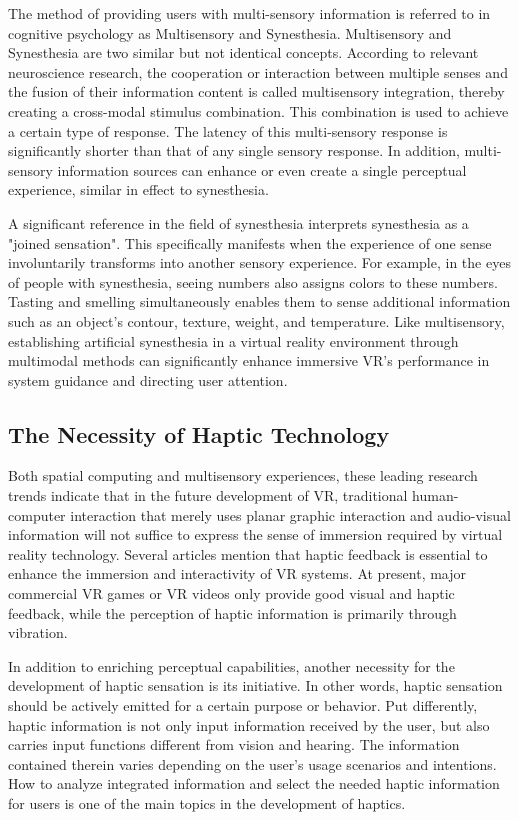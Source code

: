 The method of providing users with multi-sensory information is referred to in cognitive psychology as Multisensory and Synesthesia. Multisensory and Synesthesia are two similar but not identical concepts. According to relevant neuroscience research\cite{paper17e}, the cooperation or interaction between multiple senses and the fusion of their information content is called multisensory integration, thereby creating a cross-modal stimulus combination. This combination is used to achieve a certain type of response. The latency of this multi-sensory response is significantly shorter than that of any single sensory response. In addition, multi-sensory information sources can enhance or even create a single perceptual experience, similar in effect to synesthesia.

A significant reference\cite{paper18e} in the field of synesthesia interprets synesthesia as a "joined sensation". This specifically manifests when the experience of one sense involuntarily transforms into another sensory experience. For example, in the eyes of people with synesthesia, seeing numbers also assigns colors to these numbers. Tasting and smelling simultaneously enables them to sense additional information such as an object's contour, texture, weight, and temperature. Like multisensory, establishing artificial synesthesia in a virtual reality environment through multimodal methods can significantly enhance immersive VR's performance in system guidance and directing user attention\cite{paper19}.

\subsection{The Necessity of Haptic Technology}
Both spatial computing and multisensory experiences, these leading research trends indicate that in the future development of VR, traditional human-computer interaction that merely uses planar graphic interaction and audio-visual information will not suffice to express the sense of immersion required by virtual reality technology. Several articles\cite{paper20}\cite{paper21} mention that haptic feedback is essential to enhance the immersion and interactivity of VR systems. At present, major commercial VR games or VR videos only provide good visual and haptic feedback, while the perception of haptic information is primarily through vibration.

In addition to enriching perceptual capabilities, another necessity for the development of haptic sensation is its initiative. In other words, haptic sensation should be actively emitted for a certain purpose or behavior. Put differently, haptic information is not only input information received by the user, but also carries input functions different from vision and hearing. The information contained therein varies depending on the user's usage scenarios and intentions. How to analyze integrated information and select the needed haptic information for users\cite{paper22} is one of the main topics in the development of haptics.

